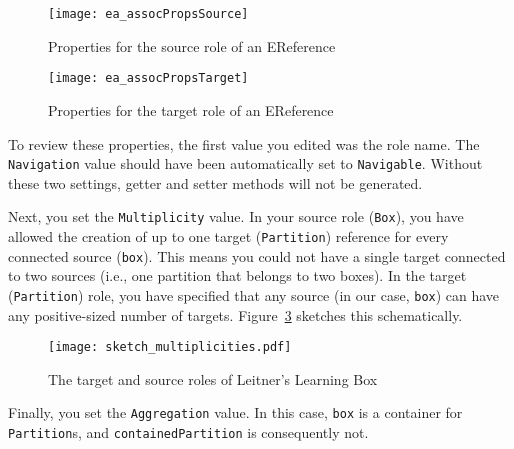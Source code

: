 \begin{itemize}
\vspace{0.5cm}

\begin{figure}[htbp]
	\centering
    \texttt{[image: ea\_assocPropsSource]}
	\caption{Properties for the source role of an EReference}
	\label{ea:role_source}
\end{figure}

\begin{figure}[htbp]
	\centering
	  \texttt{[image: ea\_assocPropsTarget]}
	\caption{Properties for the target role of an EReference}
	\label{ea:role_target}
\end{figure}

\end{itemize}

To review these properties, the first value you edited was the role name. The \texttt{Navigation} value should have been automatically set to
\texttt{Na\-vi\-ga\-ble}. Without these two settings, getter and setter methods will not be generated.

Next, you set the \texttt{Multiplicity} value.  In your source role (\texttt{Box}), you have allowed the creation of up to one target (\texttt{Partition})
reference for every connected source (\texttt{box}). This means you could not have a single target connected to two sources (i.e., one partition that belongs to
two boxes). In the target (\texttt{Partition}) role, you have specified that any source (in our case, \texttt{box}) can have any positive-sized number of targets.
Figure~\ref{fig:sketch_roles} sketches this schematically.

\vspace{0.5cm}

\begin{figure}[htbp]
	\centering
    \texttt{[image: sketch\_multiplicities.pdf]}
	\caption{The target and source roles of Leitner's Learning Box}
	\label{fig:sketch_roles}
\end{figure}
\FloatBarrier

Finally, you set the \texttt{Aggregation} value. In this case, \texttt{box} is a container for \texttt{Partition}s, and \texttt{containedPartition} is
consequently not.

